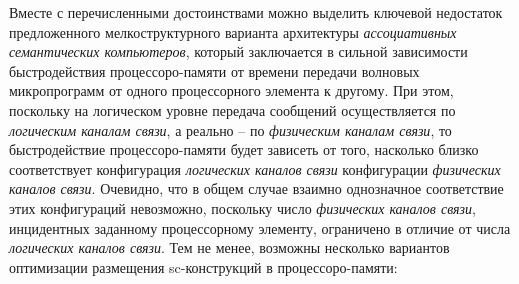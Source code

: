 Вместе с перечисленными достоинствами можно выделить ключевой недостаток предложенного мелкоструктурного варианта архитектуры \textit{ассоциативных семантических компьютеров}, который заключается в сильной зависимости быстродействия процессоро-памяти от времени передачи волновых микропрограмм от одного процессорного элемента к другому. При этом, поскольку на логическом уровне передача сообщений осуществляется по \textit{логическим каналам связи}, а реально -- по \textit{физическим каналам связи}, то быстродействие процессоро-памяти будет зависеть от того, насколько близко соответствует конфигурация \textit{логических каналов связи} конфигурации \textit{физических каналов связи}. Очевидно, что в общем случае взаимно однозначное соответствие этих конфигураций невозможно, поскольку число \textit{физических каналов связи}, инцидентных заданному процессорному элементу, ограничено в отличие от числа \textit{логических каналов связи}. Тем не менее, возможны несколько вариантов оптимизации размещения sc-конструкций в процессоро-памяти:
